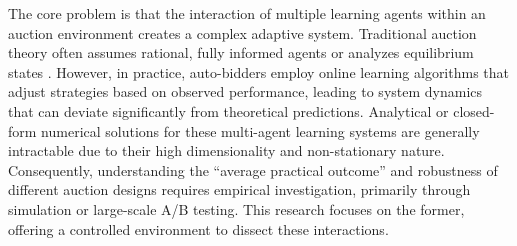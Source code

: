 \documentclass[12pt, a4paper]{article}
\begin{document}
The core problem is that the interaction of multiple learning agents within an auction environment creates a complex adaptive system. Traditional auction theory often assumes rational, fully informed agents or analyzes equilibrium states \cite{Myerson1981, Conitzer2021SPPE, Conitzer2022FPPE}. However, in practice, auto-bidders employ online learning algorithms that adjust strategies based on observed performance, leading to system dynamics that can deviate significantly from theoretical predictions. Analytical or closed-form numerical solutions for these multi-agent learning systems are generally intractable due to their high dimensionality and non-stationary nature. Consequently, understanding the ``average practical outcome'' and robustness of different auction designs requires empirical investigation, primarily through simulation or large-scale A/B testing. This research focuses on the former, offering a controlled environment to dissect these interactions.
\end{document}
